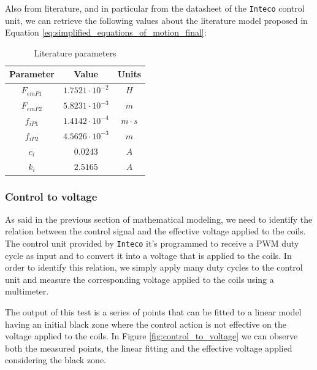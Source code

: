 Also from literature, and in particular from the datasheet of the \texttt{Inteco} control unit, we can retrieve the following values about the literature model proposed in Equation \ref{eq:simplified_equations_of_motion_final}:

\begin{table}[H]

    \centering
    \begin{tabular}{|c|c|c|}
        \hline
        \textbf{Parameter} & \textbf{Value}         & \textbf{Units} \\
        \hline
        $F_{emP1}$         & $1.7521 \cdot 10^{-2}$ & $H$            \\
        $F_{emP2}$         & $5.8231 \cdot 10^{-3}$ & $m$            \\
        $f_{iP1}$          & $1.4142 \cdot 10^{-4}$ & $m \cdot s$    \\
        $f_{iP2}$          & $4.5626 \cdot 10^{-3}$ & $m$            \\
        $c_i$              & $0.0243$               & $A$            \\
        $k_i$              & $2.5165$               & $A$            \\
        \hline
    \end{tabular}

    \caption{Literature parameters}
    \label{tab:literature_parameters}

\end{table}


\subsubsection{Control to voltage}
\label{subsubsec:control_to_voltage}

As said in the previous section of mathematical modeling, we need to identify the relation between the control signal and the effective voltage applied to the coils.
The control unit provided by \texttt{Inteco} it's programmed to receive a PWM duty cycle as input and to convert it into a voltage that is applied to the coils.
In order to identify this relation, we simply apply many duty cycles to the control unit and measure the corresponding voltage applied to the coils using a multimeter.

The output of this test is a series of points that can be fitted to a linear model having an initial black zone where the control action is not effective on the voltage applied to the coils.
In Figure \ref{fig:control_to_voltage} we can observe both the measured points, the linear fitting and the effective voltage applied considering the black zone.

